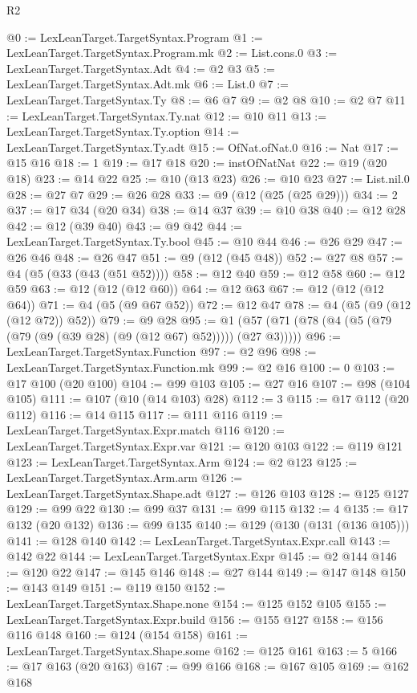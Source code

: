 \begin{lexlean}{R2}
\begin{coremodule}
@0 := LexLeanTarget.TargetSyntax.Program
@1 := LexLeanTarget.TargetSyntax.Program.mk
@2 := List.cons.{0}
@3 := LexLeanTarget.TargetSyntax.Adt
@4 := @2 @3
@5 := LexLeanTarget.TargetSyntax.Adt.mk
@6 := List.{0}
@7 := LexLeanTarget.TargetSyntax.Ty
@8 := @6 @7
@9 := @2 @8
@10 := @2 @7
@11 := LexLeanTarget.TargetSyntax.Ty.nat
@12 := @10 @11
@13 := LexLeanTarget.TargetSyntax.Ty.option
@14 := LexLeanTarget.TargetSyntax.Ty.adt
@15 := OfNat.ofNat.{0}
@16 := Nat
@17 := @15 @16
@18 := 1
@19 := @17 @18
@20 := instOfNatNat
@22 := @19 (@20 @18)
@23 := @14 @22
@25 := @10 (@13 @23)
@26 := @10 @23
@27 := List.nil.{0}
@28 := @27 @7
@29 := @26 @28
@33 := @9 (@12 (@25 (@25 @29)))
@34 := 2
@37 := @17 @34 (@20 @34)
@38 := @14 @37
@39 := @10 @38
@40 := @12 @28
@42 := @12 (@39 @40)
@43 := @9 @42
@44 := LexLeanTarget.TargetSyntax.Ty.bool
@45 := @10 @44
@46 := @26 @29
@47 := @26 @46
@48 := @26 @47
@51 := @9 (@12 (@45 @48))
@52 := @27 @8
@57 := @4 (@5 (@33 (@43 (@51 @52))))
@58 := @12 @40
@59 := @12 @58
@60 := @12 @59
@63 := @12 (@12 (@12 @60))
@64 := @12 @63
@67 := @12 (@12 (@12 @64))
@71 := @4 (@5 (@9 @67 @52))
@72 := @12 @47
@78 := @4 (@5 (@9 (@12 (@12 @72)) @52))
@79 := @9 @28
@95 := @1 (@57 (@71 (@78 (@4 (@5 (@79 (@79 (@9 (@39 @28) (@9 (@12 @67) @52))))) (@27 @3)))))
@96 := LexLeanTarget.TargetSyntax.Function
@97 := @2 @96
@98 := LexLeanTarget.TargetSyntax.Function.mk
@99 := @2 @16
@100 := 0
@103 := @17 @100 (@20 @100)
@104 := @99 @103
@105 := @27 @16
@107 := @98 (@104 @105)
@111 := @107 (@10 (@14 @103) @28)
@112 := 3
@115 := @17 @112 (@20 @112)
@116 := @14 @115
@117 := @111 @116
@119 := LexLeanTarget.TargetSyntax.Expr.match @116
@120 := LexLeanTarget.TargetSyntax.Expr.var
@121 := @120 @103
@122 := @119 @121
@123 := LexLeanTarget.TargetSyntax.Arm
@124 := @2 @123
@125 := LexLeanTarget.TargetSyntax.Arm.arm
@126 := LexLeanTarget.TargetSyntax.Shape.adt
@127 := @126 @103
@128 := @125 @127
@129 := @99 @22
@130 := @99 @37
@131 := @99 @115
@132 := 4
@135 := @17 @132 (@20 @132)
@136 := @99 @135
@140 := @129 (@130 (@131 (@136 @105)))
@141 := @128 @140
@142 := LexLeanTarget.TargetSyntax.Expr.call
@143 := @142 @22
@144 := LexLeanTarget.TargetSyntax.Expr
@145 := @2 @144
@146 := @120 @22
@147 := @145 @146
@148 := @27 @144
@149 := @147 @148
@150 := @143 @149
@151 := @119 @150
@152 := LexLeanTarget.TargetSyntax.Shape.none
@154 := @125 @152 @105
@155 := LexLeanTarget.TargetSyntax.Expr.build
@156 := @155 @127
@158 := @156 @116 @148
@160 := @124 (@154 @158)
@161 := LexLeanTarget.TargetSyntax.Shape.some
@162 := @125 @161
@163 := 5
@166 := @17 @163 (@20 @163)
@167 := @99 @166
@168 := @167 @105
@169 := @162 @168

\end{coremodule}
\end{lexlean}
